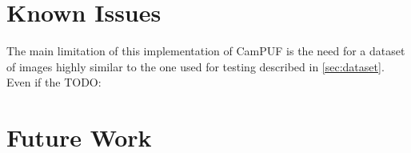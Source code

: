 \section{Known Issues}
The main limitation of this implementation of CamPUF is the need for a dataset of images highly similar to the one used for testing described in \ref{sec:dataset}. Even if the TODO:


\section{Future Work}
\label{sec:future_work}

